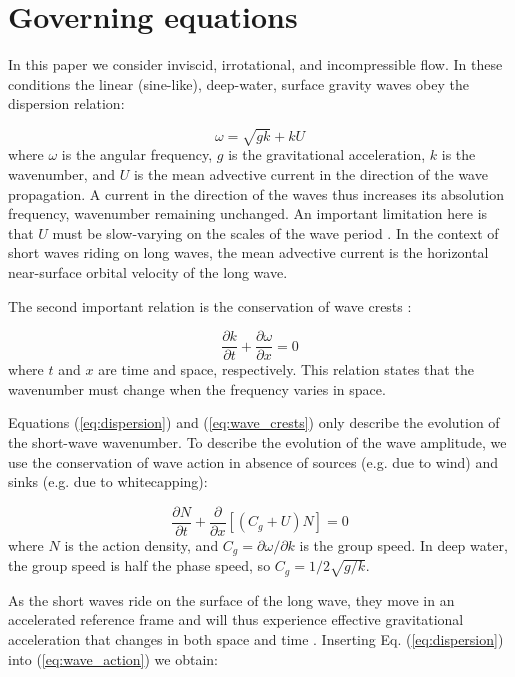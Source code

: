 \documentclass[draft]{agujournal2019}
\begin{document}
\section{Governing equations}
\label{section:governing_equations}

In this paper we consider inviscid, irrotational, and incompressible flow.
In these conditions the linear (sine-like), deep-water, surface gravity waves
obey the dispersion relation:

\begin{equation}
\label{eq:dispersion}
\omega = \sqrt{gk} + k U
\end{equation}
where $\omega$ is the angular frequency, $g$ is the gravitational acceleration,
$k$ is the wavenumber, and $U$ is the mean advective current in the direction
of the wave propagation.
A current in the direction of the waves thus increases its absolution frequency,
wavenumber remaining unchanged.
An important limitation here is that $U$ must be slow-varying on the scales of
the wave period \cite{bretherton1968wavetrains}.
In the context of short waves riding on long waves, the mean advective current
is the horizontal near-surface orbital velocity of the long wave.

The second important relation is the conservation of wave crests
\cite{phillips1981dispersion}:

\begin{equation}
\label{eq:wave_crests}
\dfrac{\partial k}{\partial t}
+ \dfrac{\partial \omega}{\partial x}
= 0
\end{equation}
where $t$ and $x$ are time and space, respectively.
This relation states that the wavenumber must change when the frequency varies
in space.

Equations (\ref{eq:dispersion}) and (\ref{eq:wave_crests}) only describe the
evolution of the short-wave wavenumber.
To describe the evolution of the wave amplitude, we use the conservation of wave
action in absence of sources (e.g. due to wind) and sinks (e.g. due to whitecapping):

\begin{equation}
\label{eq:wave_action}
\dfrac{\partial N}{\partial t}
+ \dfrac{\partial}{\partial x} \left[\left(C_g + U\right)N\right]
= 0
\end{equation}
where $N$ is the action density, and $C_g = \partial \omega / \partial k$ is the
group speed.
In deep water, the group speed is half the phase speed, so $C_g = 1/2\sqrt{g/k}$.

As the short waves ride on the surface of the long wave,
they move in an accelerated reference frame and will thus experience effective
gravitational acceleration that changes in both space and time \cite{longuet1986eulerian,longuet1987propagation}.
Inserting Eq. (\ref{eq:dispersion}) into (\ref{eq:wave_action}) we obtain:
\end{document}
